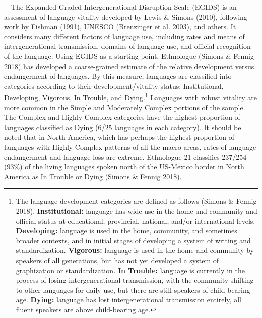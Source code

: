 \documentclass[12pt]{article}
\newenvironment{styleBody}{\renewcommand\baselinestretch{1.0}\setlength\leftskip{0in}\setlength\rightskip{0in plus 1fil}\setlength\parindent{0in}\setlength\parfillskip{0pt plus 1fil}\setlength\parskip{0in plus 1pt}\writerlistparindent\writerlistleftskip\leavevmode\normalfont\normalsize\fontsize{11pt}{13.2pt}\selectfont\mdseries\upshape\writerlistlabel\ignorespaces}{\unskip\vspace{0in plus 1pt}\par}
\newcommand\writerlistleftskip{}
\newcommand\writerlistparindent{}
\newcommand\writerlistlabel{}
\begin{document}
\begin{styleBody}
\ \ The Expanded Graded Intergenerational Disruption Scale (EGIDS) is an assessment of language vitality developed by Lewis \& Simons (2010), following work by Fishman (1991), UNESCO (Brenzinger et al. 2003), and others. It considers many different factors of language use, including rates and means of intergenerational transmission, domains of language use, and official recognition of the language. Using EGIDS as a starting point, Ethnologue (Simons \& Fennig 2018) has developed a coarse-grained estimate of the relative development versus endangerment of languages. By this measure, languages are classified into categories according to their development/vitality status: Institutional, Developing, Vigorous, In Trouble, and Dying.\footnote{\textrm{The language development categories are defined as follows (Simons \& Fennig 2018). }\textrm{\textbf{Institutional: }}\textrm{language has wide use in the home and community and official status at educational, provincial, national, and/or international levels. }\textrm{\textbf{Developing: }}\textrm{language is used in the home, community, and sometimes broader contexts, and in initial stages of developing a system of writing and standardization.}\textrm{\textit{ }}\textrm{\textbf{Vigorous: }}\textrm{language is used in the home and community by speakers of all generations, but has not yet developed a system of graphization or standardization}\textrm{\textit{. }}\textrm{\textbf{In Trouble:}}\textrm{ language is currently in the process of losing intergenerational transmission, with the community shifting to other languages for daily use, but there are still speakers of child-bearing age.}\textrm{\textit{ }}\textrm{\textbf{Dying:}}\textrm{ language has lost intergenerational transmission entirely, all fluent speakers are above child-bearing age.}} Languages with robust vitality are more common in the Simple and Moderately Complex portions of the sample. The Complex and Highly Complex categories have the highest proportion of languages classified as Dying (6/25 languages in each category). It should be noted that in North America, which has perhaps the highest proportion of languages with Highly Complex patterns of all the macro-areas, rates of language endangerment and language loss are extreme. Ethnologue 21 classifies 237/254 (93\%) of the living languages spoken north of the US-Mexico border in North America as In Trouble or Dying (Simons \& Fennig 2018). 
\end{styleBody}
\end{document}
